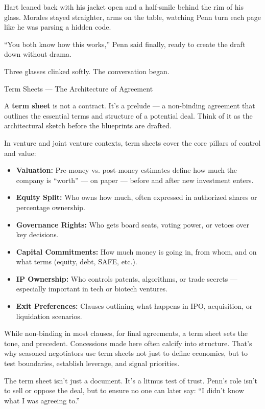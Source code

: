 Hart leaned back with his jacket open and a half-smile behind the rim of his glass.
Morales stayed straighter, arms on the table, watching Penn turn each page like he was parsing a hidden code.

``You both know how this works,'' Penn said finally, ready to create the draft down without drama. 

Three glasses clinked softly.
The conversation began.

\medskip

\begin{TechnicalSidebar}{Term Sheets — The Architecture of Agreement}

  A \textbf{term sheet} is not a contract. It’s a prelude — a non-binding agreement that outlines the essential terms 
  and structure of a potential deal. Think of it as the architectural sketch before the blueprints are drafted.
  
  \medskip
  
  In venture and joint venture contexts, term sheets cover the core pillars of control and value:

  \medskip
  
  \begin{itemize}
    \item \textbf{Valuation:} Pre-money vs. post-money estimates define how much the company is “worth” — on paper — 
    before and after new investment enters.
    \item \textbf{Equity Split:} Who owns how much, often expressed in authorized shares or percentage ownership.
    \item \textbf{Governance Rights:} Who gets board seats, voting power, or vetoes over key decisions.
    \item \textbf{Capital Commitments:} How much money is going in, from whom, and on what terms (equity, debt, SAFE, etc.).
    \item \textbf{IP Ownership:} Who controls patents, algorithms, or trade secrets — especially important in tech or 
    biotech ventures.
    \item \textbf{Exit Preferences:} Clauses outlining what happens in IPO, acquisition, or liquidation scenarios.
  \end{itemize}
  
  \medskip
  
  While non-binding in most clauses, for final agreements, a term sheet sets the tone, and precedent. Concessions made 
  here often calcify into structure. That’s why seasoned negotiators use term sheets not just to define economics, but to 
  test boundaries, establish leverage, and signal priorities.
  
  \medskip
  
  The term sheet isn’t just a document. It’s a litmus test of trust. Penn’s role isn’t to sell 
  or oppose the deal, but to ensure no one can later say: ``I didn’t know what I was agreeing to.''
  
\end{TechnicalSidebar}

